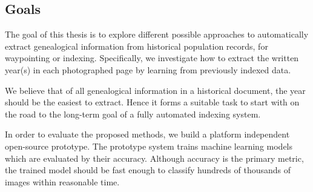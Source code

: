 \subsection{Goals}

The goal of this thesis is to explore different possible approaches to automatically extract genealogical information from historical population records, for waypointing or indexing. Specifically, we investigate how to extract the written year(s) in each photographed page by learning from previously indexed data.

We believe that of all genealogical information in a historical document, the year should be the easiest to extract. Hence it forms a suitable task to start with on the road to the long-term goal of a fully automated indexing system.


In order to evaluate the proposed methods, we build a platform independent open-source prototype. The prototype system trains machine learning models which are evaluated by their accuracy.
Although accuracy is the primary metric, the trained model should be fast enough to classify hundreds of thousands of images within reasonable time.



